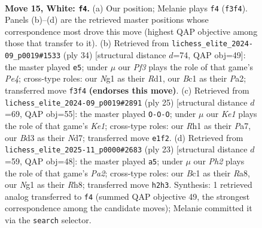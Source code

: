 \documentclass[11pt]{article}
\begin{document}
\clearpage

\begin{figure}[p]\centering
\begin{subfigure}{0.46\textwidth}\centering
\resizebox{\linewidth}{!}{%
\newchessgame
\chessboard[
  setfen={r1b1k2r/pp1nbppp/4p3/3pP3/3n4/3B1PP1/P2N3P/R1B1K1NR w KQ - 0 15},
  showmover=false,
  pgfstyle=straightmove, color=movearrow, markmove={f3-f4}
]}
\caption{}
\end{subfigure}\hfill
\begin{subfigure}{0.46\textwidth}\centering
\resizebox{\linewidth}{!}{%
\newchessgame
\chessboard[
  setfen={r1b1k2r/1p2bppp/p4n2/2p5/4PN2/2P1BP2/P1P4P/2KR1B1R w kq - 2 18},
  showmover=false,
  pgfstyle=straightmove, color=movearrow, markmove={e4-e5}
]}
\caption{}
\end{subfigure}
\\[4pt]
\begin{subfigure}{0.46\textwidth}\centering
\resizebox{\linewidth}{!}{%
\newchessgame
\chessboard[
  setfen={r3k2r/pp1nbppp/2p1p3/N6b/1n1P4/1PN2P2/1P1BP1PP/R2K1B1R b kq - 2 13},
  showmover=false,
  pgfstyle=straightmove, color=movearrow, markmove={e8-c8}
]}
\caption{}
\end{subfigure}\hfill
\begin{subfigure}{0.46\textwidth}\centering
\resizebox{\linewidth}{!}{%
\newchessgame
\chessboard[
  setfen={r1b1k2r/ppp1bppp/2p5/4P3/3N3n/2N4P/PPP2PP1/R1BR2K1 b - - 6 12},
  showmover=false,
  pgfstyle=straightmove, color=movearrow, markmove={a7-a5}
]}
\caption{}
\end{subfigure}
\caption{\textbf{Move 15, White: \texttt{f4}.} (a) Our position; Melanie plays \texttt{f4} (\texttt{f3f4}). Panels (b)--(d) are the retrieved master positions whose correspondence most drove this move (highest QAP objective among those that transfer to it). (b) Retrieved from \texttt{lichess\_elite\_2024-09\_p0019\#1533} (ply 34) [structural distance $d$=74, QAP obj=49]: the master played \texttt{e5}; under $\mu$ our \emph{Pf3} plays the role of that game's \emph{Pe4}; cross-type roles: our \emph{N}g1 as their \emph{R}d1, our \emph{B}c1 as their \emph{P}a2; transferred move \texttt{f3f4} \textbf{(endorses this move)}. (c) Retrieved from \texttt{lichess\_elite\_2024-09\_p0019\#2891} (ply 25) [structural distance $d$=69, QAP obj=55]: the master played \texttt{O-O-O}; under $\mu$ our \emph{Ke1} plays the role of that game's \emph{Ke1}; cross-type roles: our \emph{R}h1 as their \emph{P}a7, our \emph{B}d3 as their \emph{N}d7; transferred move \texttt{e1f2}. (d) Retrieved from \texttt{lichess\_elite\_2025-11\_p0000\#2683} (ply 23) [structural distance $d$=59, QAP obj=48]: the master played \texttt{a5}; under $\mu$ our \emph{Ph2} plays the role of that game's \emph{Pa2}; cross-type roles: our \emph{B}c1 as their \emph{R}a8, our \emph{N}g1 as their \emph{R}h8; transferred move \texttt{h2h3}. Synthesis: 1 retrieved analog transferred to \texttt{f4} (summed QAP objective 49, the strongest correspondence among the candidate moves); Melanie committed it via the \texttt{search} selector.}
\label{fig:thought-m28}
\end{figure}
\end{document}
